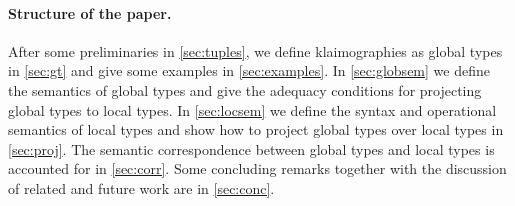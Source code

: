 \paragraph{Structure of the paper.}
 After some preliminaries in \cref{sec:tuples}, we
define klaimographies as global types in \cref{sec:gt} and give some
examples in \cref{sec:examples}.  In \cref{sec:globsem} we define the
semantics of global types and give the adequacy conditions for
projecting global types to local types.  In \cref{sec:locsem} we
define the syntax and operational semantics of local types and show
how to project global types over local types in \cref{sec:proj}.  The
semantic correspondence between global types and local types is
accounted for in \cref{sec:corr}.  Some concluding remarks together
with the discussion of related and future work are in \cref{sec:conc}.



